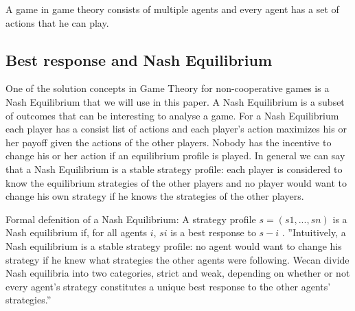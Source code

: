 A game in game theory consists of multiple agents and every agent has a set of actions that he can play. 



\subsection{Best response and Nash Equilibrium}
One of the solution concepts in Game Theory for non-cooperative games is a Nash Equilibrium that we will use in this paper. A Nash Equilibrium is a subset of outcomes that can be interesting to analyse a game. For a Nash Equilibrium each player has a consist list of actions and each player's action maximizes his or her payoff given the actions of the other players. Nobody has the incentive to change his or her action if an equilibrium profile is played. In general we can say that a Nash Equilibrium is a stable strategy profile: each player is considered to know the equilibrium strategies of the other players and no player would want to change his own strategy if he knows the strategies of the other players. 

Formal defenition of a Nash Equilibrium:
A strategy profile $s = (s1, . . . , sn)$ is a Nash equilibrium
if, for all agents $i$, $si$ is a best response to $s-i$ .
''Intuitively, a Nash equilibrium is a stable strategy profile: no agent would want to change
his strategy if he knew what strategies the other agents were following.
Wecan divide Nash equilibria into two categories, strict and weak, depending on whether
or not every agent's strategy constitutes a unique best response to the other agents' strategies.''



